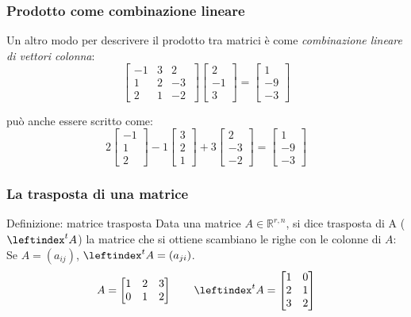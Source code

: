 \documentclass[x11names]{article}
\begin{document}
\subsubsection{Prodotto come combinazione lineare}
Un altro modo per descrivere il prodotto tra matrici è come \textit{combinazione lineare di vettori colonna}:
\[
\begin{bmatrix}
    -1 & 3 & 2 \\
    1 & 2 & -3 \\
    2 & 1 & -2 \
\end{bmatrix}
\begin{bmatrix}
2 \\ -1 \\ 3
\end{bmatrix}
=
\begin{bmatrix}
1 \\ -9  \\ -3
\end{bmatrix}
\] 

può anche essere scritto come:
\[
2 \begin{bmatrix}
-1 \\ 1 \\ 2
\end{bmatrix}
-1
\begin{bmatrix}
3 \\ 2   \\ 1 
\end{bmatrix}
+3
\begin{bmatrix}
2 \\ -3  \\ -2 
\end{bmatrix}
= 
\begin{bmatrix}
1 \\-9  \\-3 
\end{bmatrix}
\] 

\subsubsection{La trasposta di una matrice}
\begin{center}
\colorbox{myblue}{\begin{minipage}{5.75in}
\begin{blues}{Definizione: matrice trasposta}
    Data una matrice $A \in \mathbb{R}^{r,n}$, si dice trasposta di A ($\leftindex^t{A}$) la matrice che si ottiene scambiano le righe con le colonne di $A$: Se $A = (a_{ij})$, $\leftindex^t{A} = (a_{ji})$.
$$
    A = \begin{bmatrix}
        1 & 2 & 3 \\
        0 & 1 & 2 
    \end{bmatrix}
    \qquad
    \leftindex^t{A} = \begin{bmatrix}
        1 & 0 \\
        2 & 1 \\
        3 & 2
    \end{bmatrix}
$$

\end{blues}
\end{minipage}}        
\end{center}
\end{document}
